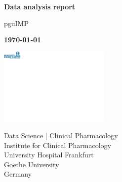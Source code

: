 \begin{titlepage}
   \begin{center}
       \vspace*{1cm}

       \textbf{Data analysis report}

       \vspace{0.5cm}
        pguIMP
            
       \vspace{1.5cm}

       \textbf{\today}

       \vfill
            
       \vspace{0.8cm}
     
       \includegraphics[page=1, width=0.4\textwidth, clip, trim=0 530 700 0]{tex/ukf_logo.pdf}
       
       \vspace{0.8cm}
       \vfill
            
       Data Science | Clinical Pharmacology\\
       Institute for Clinical Pharmacology\\
       University Hospital Frankfurt\\
       Goethe University\\
       Germany
            
   \end{center}
\end{titlepage}


